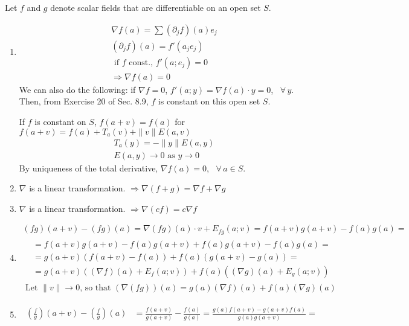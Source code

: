 \documentclass[twoside]{amsart}
\theoremstyle{plain}
\theoremstyle{definition}
\newcommand{\exercisehead}[1]
  {
   \noindent{\small\bf Exercise #1.}
   \smallskip}
\begin{document}
\exercisehead{7} Let $f$ and $g$ denote scalar fields that are differentiable on an open set $S$.  
\begin{enumerate}
  \item 
\[
\begin{gathered}
  \nabla f(a) = \sum (\partial_j f)(a) e_j \\
  (\partial_j f)(a) = f'(a_j e_j) \\
  \text{ if $f$ const., $f'(a;e_j) = 0$ } \\
  \Longrightarrow \nabla f(a) = 0 
\end{gathered}
\]
We can also do the following: if $\nabla f = 0$, $f'(a;y) = \nabla f(a) \cdot y = 0$, \, $\forall \, y$.  Then, from Exercise 20 of Sec. 8.9, $f$ is constant on this open set $S$. 

If $f$ is constant on $S$, $f(a+v) = f(a)$ for $f(a+v) = f(a) + T_a(v) + \| v \| E(a,v)$
\[
\begin{gathered}
  T_a(y) = - \| y \| E(a,y) \\
  E(a,y) \to 0 \text{ as } y\to 0 
\end{gathered}
\]
By uniqueness of the total derivative, $\nabla f(a) = 0$, \, $\forall \, a \in S$.  
  \item $\nabla$ is a linear transformation.  $\Longrightarrow \nabla (f+g) = \nabla f + \nabla g$ 
  \item $\nabla$ is a linear transformation.  $\Longrightarrow \nabla (cf) = c \nabla f $
  \item 
\[
\begin{gathered}
  (fg)(a+v) -(fg)(a) = \nabla (fg)(a) \cdot v + E_{fg}(a;v) = f(a+v)g(a+v) - f(a)g(a) = \\
  \begin{aligned}
    & = f(a+v)g(a+v) - f(a)g(a+v) + f(a) g(a+v) - f(a)g(a) = \\ 
    & = g(a+v)(f(a+v) - f(a)) + f(a)(g(a+v) - g(a)) = \\
    & = g(a+v) ( (\nabla f)(a) + E_f(a;v) ) + f(a) ((\nabla g) (a) + E_g(a;v) ) 
  \end{aligned} \\
\text{ Let $\| v \| \to 0$, so that $(\nabla(fg))(a) = g(a) (\nabla f)(a) + f(a) (\nabla g)(a) $ }
\end{gathered}
\]
  \item 
\[
\begin{gathered}
\begin{aligned}  
  \left( \frac{f}{g} \right)(a+v) - \left(\frac{f}{g} \right)(a) & = \frac{ f(a+v)}{ g(a+v)} - \frac{ f(a) }{ g(a) } = \frac{ g(a) f(a+v) - g(a+v)f(a) }{ g(a)g(a+v) } = \\

\end{aligned}
\end{gathered}\]
\end{enumerate}
\end{document}
